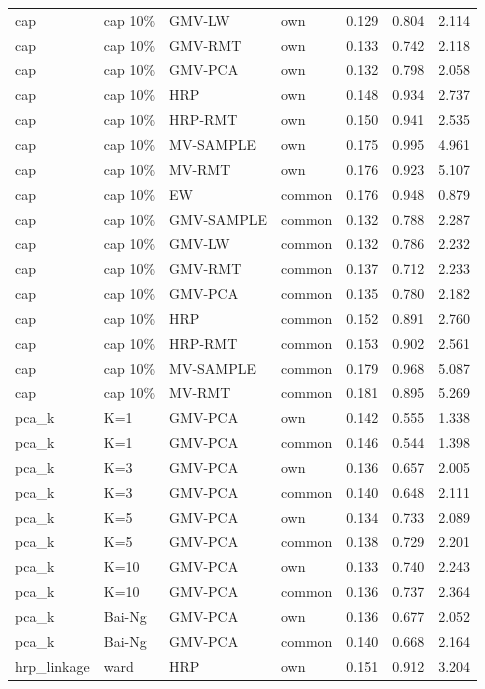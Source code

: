 \begin{table}[t]
{\begin{tabular}{llllrrr}
cap & cap 10\% & GMV-LW & own & 0.129 & 0.804 & 2.114 \\
cap & cap 10\% & GMV-RMT & own & 0.133 & 0.742 & 2.118 \\
cap & cap 10\% & GMV-PCA & own & 0.132 & 0.798 & 2.058 \\
cap & cap 10\% & HRP & own & 0.148 & 0.934 & 2.737 \\
cap & cap 10\% & HRP-RMT & own & 0.150 & 0.941 & 2.535 \\
cap & cap 10\% & MV-SAMPLE & own & 0.175 & 0.995 & 4.961 \\
cap & cap 10\% & MV-RMT & own & 0.176 & 0.923 & 5.107 \\
cap & cap 10\% & EW & common & 0.176 & 0.948 & 0.879 \\
cap & cap 10\% & GMV-SAMPLE & common & 0.132 & 0.788 & 2.287 \\
cap & cap 10\% & GMV-LW & common & 0.132 & 0.786 & 2.232 \\
cap & cap 10\% & GMV-RMT & common & 0.137 & 0.712 & 2.233 \\
cap & cap 10\% & GMV-PCA & common & 0.135 & 0.780 & 2.182 \\
cap & cap 10\% & HRP & common & 0.152 & 0.891 & 2.760 \\
cap & cap 10\% & HRP-RMT & common & 0.153 & 0.902 & 2.561 \\
cap & cap 10\% & MV-SAMPLE & common & 0.179 & 0.968 & 5.087 \\
cap & cap 10\% & MV-RMT & common & 0.181 & 0.895 & 5.269 \\
pca\_k & K=1 & GMV-PCA & own & 0.142 & 0.555 & 1.338 \\
pca\_k & K=1 & GMV-PCA & common & 0.146 & 0.544 & 1.398 \\
pca\_k & K=3 & GMV-PCA & own & 0.136 & 0.657 & 2.005 \\
pca\_k & K=3 & GMV-PCA & common & 0.140 & 0.648 & 2.111 \\
pca\_k & K=5 & GMV-PCA & own & 0.134 & 0.733 & 2.089 \\
pca\_k & K=5 & GMV-PCA & common & 0.138 & 0.729 & 2.201 \\
pca\_k & K=10 & GMV-PCA & own & 0.133 & 0.740 & 2.243 \\
pca\_k & K=10 & GMV-PCA & common & 0.136 & 0.737 & 2.364 \\
pca\_k & Bai-Ng & GMV-PCA & own & 0.136 & 0.677 & 2.052 \\
pca\_k & Bai-Ng & GMV-PCA & common & 0.140 & 0.668 & 2.164 \\
hrp\_linkage & ward & HRP & own & 0.151 & 0.912 & 3.204 \\

\end{tabular}}
\end{table}
